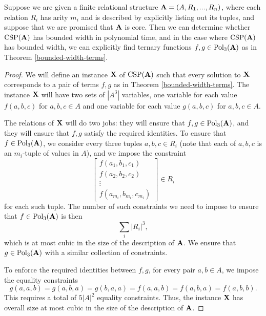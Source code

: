 \documentclass[letterpaper,11pt]{article}
\DeclareMathOperator{\Pol}{Pol}
\DeclareMathOperator{\CSP}{CSP}
\begin{document}
\begin{thm} Suppose we are given a finite relational structure $\mathbf{A} = (A, R_1, ..., R_n)$, where each relation $R_i$ has arity $m_i$ and is described by explicitly listing out its tuples, and suppose that we are promised that $\mathbf{A}$ is core. Then we can determine whether $\CSP(\fA)$ has bounded width in polynomial time, and in the case where $\CSP(\fA)$ has bounded width, we can explicitly find ternary functions $f,g \in \Pol_3(\fA)$ as in Theorem \ref{bounded-width-terms}.
\end{thm}
\begin{proof} We will define an instance $\mathbf{X}$ of $\CSP(\fA)$ such that every solution to $\mathbf{X}$ corresponds to a pair of terms $f,g$ as in Theorem \ref{bounded-width-terms}. The instance $\mathbf{X}$ will have two sets of $|A^3|$ variables, one variable for each value $f(a,b,c)$ for $a,b,c \in A$ and one variable for each value $g(a,b,c)$ for $a,b,c \in A$.

The relations of $\mathbf{X}$ will do two jobs: they will ensure that $f, g \in \Pol_3(\fA)$, and they will ensure that $f,g$ satisfy the required identities. To ensure that $f \in \Pol_3(\fA)$, we consider every three tuples $a, b, c \in R_i$ (note that each of $a,b,c$ is an $m_i$-tuple of values in $A$), and we impose the constraint
\[
\begin{bmatrix} f(a_1,b_1,c_1)\\ f(a_2,b_2,c_2)\\ \vdots\\ f(a_{m_i}, b_{m_i}, c_{m_i})\end{bmatrix} \in R_i
\]
for each such tuple. The number of such constraints we need to impose to ensure that $f \in \Pol_3(\fA)$ is then
\[
\sum_i |R_i|^3,
\]
which is at most cubic in the size of the description of $\mathbf{A}$. We ensure that $g \in \Pol_3(\fA)$ with a similar collection of constraints.

To enforce the required identities between $f,g$, for every pair $a,b \in A$, we impose the equality constraints
\[
g(a,a,b) = g(a,b,a) = g(b,a,a) = f(a,a,b) = f(a,b,a) = f(a,b,b).
\]
This requires a total of $5|A|^2$ equality constraints. Thus, the instance $\mathbf{X}$ has overall size at most cubic in the size of the description of $\mathbf{A}$.


\end{proof}
\end{document}
